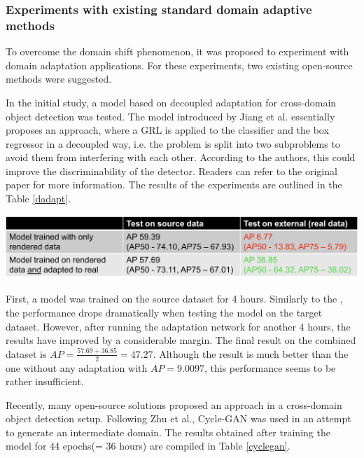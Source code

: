 \documentclass[english, 12pt, a4paper, elec, utf8, a-1b, online]{aaltothesis}
\begin{document}
\subsubsection{Experiments with existing standard domain adaptive methods}
To overcome the domain shift phenomenon, it was proposed to experiment with domain adaptation applications. For these experiments, two existing open-source methods were suggested. 

In the initial study, a model based on decoupled adaptation for cross-domain object detection \cite{Jiang2021} was tested. The model introduced by Jiang et al. essentially proposes an  approach, where a GRL is applied to the classifier and the box regressor in a decoupled way, i.e. the problem is split into two subproblems to avoid them from interfering with each other. According to the authors, this could improve the discriminability of the detector. Readers can refer to the original paper \cite{Jiang2021} for more information. The results of the experiments are outlined in the Table \ref{dadapt}.

\begin{table}[htb]
	\begin{center}
		\includegraphics[width=14cm]{./dadapt.png}
	\end{center}
	\begin{center}
		\label{dadapt}
	\end{center}
\end{table}
\FloatBarrier

First, a model was trained on the source dataset for 4 hours. Similarly to the , the performance drops dramatically when testing the model on the target dataset. However, after running the adaptation network for another 4 hours, the results have improved by a considerable margin. The final result on the combined dataset is $AP = \frac{57.69+36.85}{2} = 47.27$. Although the result is much better than the one without any adaptation with $AP = 9.0097$, this performance seems to be rather insufficient. 

Recently, many open-source solutions proposed \cite{Inoue_2018_CVPR} \cite{Chen2020} \cite{Arruda2019} an  approach in a cross-domain object detection setup. Following Zhu et al., Cycle-GAN \cite{Zhu2017} was used in an attempt to generate an intermediate domain. The results obtained after training the model for 44 epochs(= 36 hours) are compiled in Table \ref{cyclegan}.  
\end{document}
